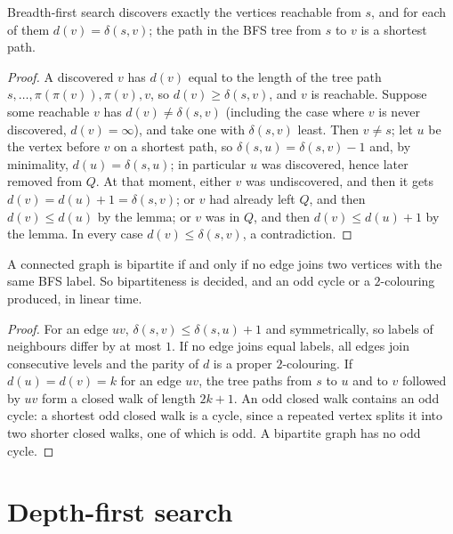 \begin{theorem}\label{thm:bfs}
Breadth-first search discovers exactly the vertices reachable from $s$, and for each of them $d(v)=\delta(s,v)$; the path in the BFS tree from $s$ to $v$ is a shortest path.
\end{theorem}
\begin{proof}
A discovered $v$ has $d(v)$ equal to the length of the tree path $s,\dots,\pi(\pi(v)),\pi(v),v$, so $d(v)\ge\delta(s,v)$, and $v$ is reachable. Suppose some reachable $v$ has $d(v)\ne\delta(s,v)$
(including the case where $v$ is never discovered, $d(v)=\infty$), and take one with $\delta(s,v)$ least. Then $v\ne s$; let $u$ be the vertex before $v$ on a shortest path, so $\delta(s,u)=\delta(s,v)-1$
and, by minimality, $d(u)=\delta(s,u)$; in particular $u$ was discovered, hence later removed from $Q$. At that moment, either $v$ was undiscovered, and then it gets $d(v)=d(u)+1=\delta(s,v)$;
or $v$ had already left $Q$, and then $d(v)\le d(u)$ by the lemma; or $v$ was in $Q$, and then $d(v)\le d(u)+1$ by the lemma. In every case $d(v)\le\delta(s,v)$, a contradiction.
\end{proof}

\begin{corollary}\label{cor:bipartite}
A connected graph is bipartite if and only if no edge joins two vertices with the same BFS label. So bipartiteness is decided, and an odd cycle or a $2$-colouring produced,
in linear time.
\end{corollary}
\begin{proof}
For an edge $uv$, $\delta(s,v)\le\delta(s,u)+1$ and symmetrically, so labels of neighbours differ by at most $1$. If no edge joins equal labels, all edges join consecutive levels and the
parity of $d$ is a proper $2$-colouring. If $d(u)=d(v)=k$ for an edge $uv$, the tree paths from $s$ to $u$ and to $v$ followed by $uv$ form a closed walk of length $2k+1$. An odd closed
walk contains an odd cycle: a shortest odd closed walk is a cycle, since a repeated vertex splits it into two shorter closed walks, one of which is odd. A bipartite graph has no odd cycle.
\end{proof}

\section{Depth-first search}\label{sec:dfs}

